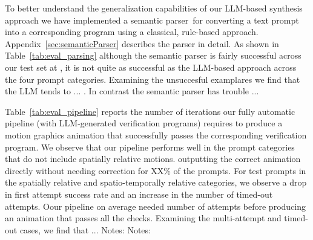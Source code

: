 To better understand the generalization capabilities of our LLM-based
synthesis approach we have implemented a semantic
parser\,\cite{kamath2018survey} for converting a text prompt into a
corresponding \dslname{} program using a classical, rule-based
approach. Appendix~\ref{sec:semanticParser} describes the parser in
detail. As shown in Table~\ref{tab:eval_parsing} although the semantic
parser is fairly successful across our test set at , it is
not quite as successful as the LLM-based approach across the four
prompt categories.
%
Examining the unsuccesful examplares we find that the LLM tends to
... .
%
In contrast the semantic parser has trouble ... 




\vspace{0.5em}
Table~\ref{tab:eval_pipeline} reports the number of iterations our
fully automatic pipeline (with LLM-generated verification programs)
 requires to produce a motion graphics animation that
successfully passes the corresponding verification program.
%
We observe that our pipeline performs well in the 
prompt categories that do not include spatially relative motions.
outputting the correct animation directly without needing correction for XX\% of the prompts. 
%
For test prompts in the spatially relative and spatio-temporally
relative categories, we observe a drop in first attempt success rate
and an increase in the number of timed-out attempts.  Oour pipeline on
average needed  number of attempts before producing an
animation that passes all the checks.  Examining the multi-attempt and
timed-out cases, we find that ...    Notes:  Notes:




